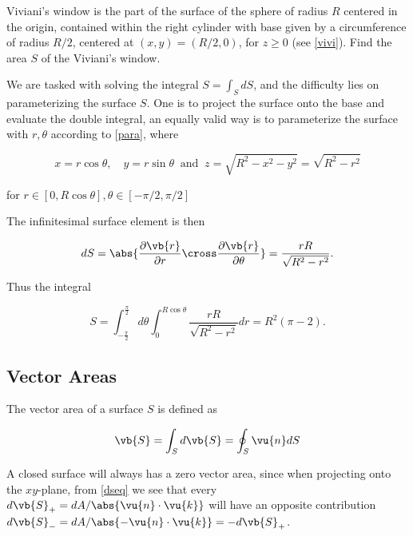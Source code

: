 \documentclass[english,a4paper,12pt]{report}
\begin{document}
{Viviani's window is the part of the surface of the sphere of radius \(R\) centered in the origin, contained within the right cylinder with base given by a circumference of radius \( R/2\), centered at \((x,y) = \left(R /2, 0\right)\), for \(z \ge 0\) (see \cref{vivi}). Find the area \(S\) of the Viviani's window.}
{We are tasked with solving the integral \(S = \int_{S}^{} dS \), and the difficulty lies on parameterizing the surface \(S\). One is to project the surface onto the base and evaluate the double integral, an equally valid way is to parameterize the surface with \(r, \theta \) according to \cref{para}, where 

\begin{equation}
	x = r\cos \theta , \quad y = r\sin \theta ~\text { and }~ z = \sqrt{R^2 - x^2 - y^2} = \sqrt{R^2 - r^2}
\end{equation}

for \( r \in [0,R\cos \theta ], \theta \in \left[-\pi /2, \pi /2  \right]\) 

The infinitesimal surface element is then 

\begin{equation}
	dS = \abs{\frac{\partial \vb{r} }{\partial r} \cross \frac{\partial \vb{r} }{\partial \theta }  } = \frac{rR}{\sqrt{R^2-r^2} }. 
\end{equation}

Thus the integral

\begin{equation}
	S = \int_{-\frac{\pi }{2} }^{\frac{\pi }{2} }d \theta \int_{0}^{R\cos \theta }\frac{rR}{\sqrt{R^2 - r^2} }dr = R^2(\pi -2).     
\end{equation}



} 



\subsection{Vector Areas}

The vector area of a surface \(S\) is defined as

\begin{equation}
	\vb{S}  = \int_{S}^{} d\vb{S} = \oint_{S} \vu{n} dS
\end{equation}

A closed surface will always has a zero vector area, since when projecting onto the \(xy\)-plane, from \cref{dseq} we see that every \( d\vb{S} _{+}  = dA/\abs{\vu{n} \cdot \vu{k} }\) will have an opposite contribution \( d\vb{S} _{-} = dA/\abs{- \vu{n} \cdot \vu{k} } = -d\vb{S} _{+} \). 
\end{document}
